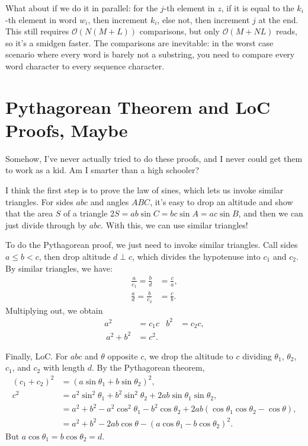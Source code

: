 \documentclass[12pt]{report}
\newcommand*{\p}[1]{\left(#1\right)}
\begin{document}
What about if we do it in parallel: for the $j$-th element in $z$, if it is
equal to the $k_i$-th element in word $w_i$, then increment $k_i$, else not,
then increment $j$ at the end. This still requires $\mathcal{O}(N(M + L))$
comparisons, but only $\mathcal{O}\p{M + NL}$ reads, so it's a smidgen faster.
The comparisons are inevitable: in the worst case scenario where every word is
barely not a substring, you need to compare every word character to every
sequence character.

\section{Pythagorean Theorem and LoC Proofs, Maybe}

Somehow, I've never actually tried to do these proofs, and I never could get
them to work as a kid. Am I smarter than a high schooler?

I think the first step is to prove the law of sines, which lets us invoke
similar triangles. For sides $abc$ and angles $ABC$, it's easy to drop an
altitude and show that the area $S$ of a triangle $2S = ab\sin C = bc\sin A =
ac\sin B$, and then we can just divide through by $abc$. With this, we can use
similar triangles!

To do the Pythagorean proof, we just need to invoke similar triangles. Call
sides $a \leq b < c$, then drop altitude $d \perp c$, which divides the
hypotenuse into $c_1$ and $c_2$. By similar triangles, we have:
\begin{align*}
    \frac{a}{c_1} = \frac{b}{d} &= \frac{c}{a},\\
    \frac{a}{d} = \frac{b}{c_2} &= \frac{c}{b}.
\end{align*}
Multiplying out, we obtain
\begin{align*}
    a^2 &= c_1c & b^2 &= c_2c,\\\
    a^2 + b^2 &= c^2.
\end{align*}

Finally, LoC. For $abc$ and $\theta$ opposite $c$, we drop the altitude to $c$
dividing $\theta_1$, $\theta_2$, $c_1$, and $c_2$ with length $d$. By the
Pythagorean theorem,
\begin{align*}
    \p{c_1 + c_2}^2 &= \p{a\sin \theta_1 + b\sin \theta_2}^2,\\
    c^2 &= a^2\sin^2\theta_1 + b^2\sin^2\theta_2
            + 2ab\sin\theta_1 \sin \theta_2,\\
        &= a^2 + b^2 - a^2\cos^2\theta_1 - b^2\cos\theta_2
            + 2ab\p{\cos\theta_1 \cos\theta_2 - \cos\theta},\\
        &= a^2 + b^2 - 2ab\cos\theta
            - \p{a\cos\theta_1 - b\cos\theta_2}^2.
\end{align*}
But $a\cos\theta_1 = b\cos\theta_2 = d$.
\end{document}
